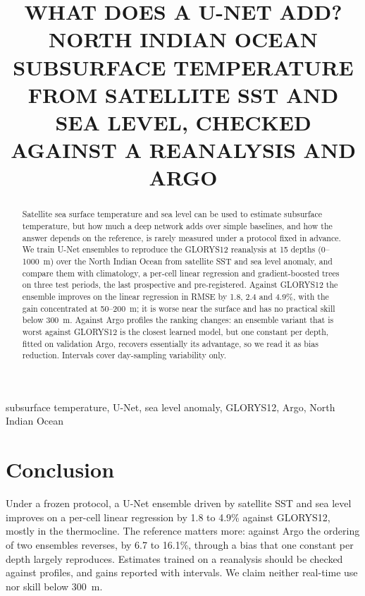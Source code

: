 \documentclass[conference,a4paper]{IEEEtran}
\begin{document}
\title{\uppercase{What does a U-Net add? North Indian Ocean subsurface temperature from satellite SST and sea level, checked against a reanalysis and Argo}}

\author{
}

\maketitle

\begin{abstract}
Satellite sea surface temperature and sea level can be used to estimate subsurface temperature, but how much a deep network adds over simple baselines, and how the answer depends on the reference, is rarely measured under a protocol fixed in advance. We train U-Net ensembles to reproduce the GLORYS12 reanalysis at 15 depths (0--1000~m) over the North Indian Ocean from satellite SST and sea level anomaly, and compare them with climatology, a per-cell linear regression and gradient-boosted trees on three test periods, the last prospective and pre-registered. Against GLORYS12 the ensemble improves on the linear regression in RMSE by 1.8, 2.4 and 4.9\%, with the gain concentrated at 50--200~m; it is worse near the surface and has no practical skill below 300~m. Against Argo profiles the ranking changes: an ensemble variant that is worst against GLORYS12 is the closest learned model, but one constant per depth, fitted on validation Argo, recovers essentially its advantage, so we read it as bias reduction. Intervals cover day-sampling variability only.
\end{abstract}

\begin{IEEEkeywords}
subsurface temperature, U-Net, sea level anomaly, GLORYS12, Argo, North Indian Ocean
\end{IEEEkeywords}







\section{Conclusion}
\label{sec:conclusion}
Under a frozen protocol, a U-Net ensemble driven by satellite SST and sea level improves on a per-cell linear regression by 1.8 to 4.9\% against GLORYS12, mostly in the thermocline. The reference matters more: against Argo the ordering of two ensembles reverses, by 6.7 to 16.1\%, through a bias that one constant per depth largely reproduces. Estimates trained on a reanalysis should be checked against profiles, and gains reported with intervals. We claim neither real-time use nor skill below 300~m.

\small


\end{document}
